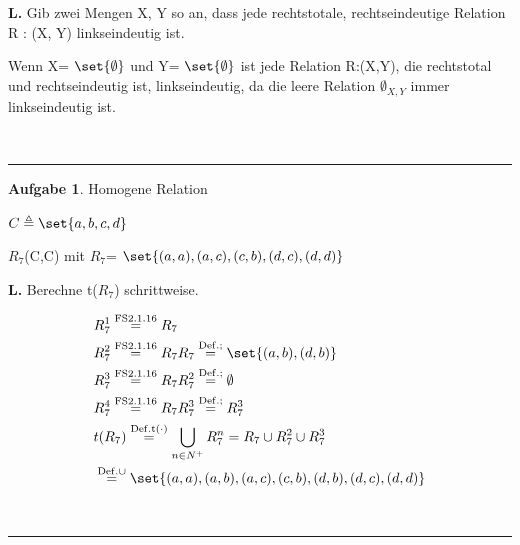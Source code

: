 \documentclass[10pt,leqno ]{article}
\DeclarePairedDelimiter\set\{\}
\newcommand\customeq[1]{\overset{\mathrm{#1}}{=}}
\theoremstyle{definition}
\newtheorem{problem}[theorem]{Aufgabe}
\newenvironment{solution}[1][L]{\begin{doublespace}\textbf{#1.}\quad }{\ \rule{0.5em}{0.5em}\end{doublespace}}
\begin{document}
\begin{solution}  
Gib zwei Mengen X, Y so an, dass jede rechtstotale, rechtseindeutige Relation R : (X, Y)
linkseindeutig ist.
   
   Wenn 
   X= \(\set {\emptyset} \)
   und Y= \(\set {\emptyset}\)
   ist jede Relation R:(X,Y), die rechtstotal und rechtseindeutig ist, linkseindeutig, da die leere Relation \(\emptyset_{X,Y}\) immer linkseindeutig ist.

   
\end{solution}

\begin{problem}
Homogene Relation
\end{problem}

   \( C \triangleq \set{ a,b,c,d} \)

   $R_7$(C,C) mit $R_7$= \( \set{ (a,a),(a,c),(c,b),(d,c),(d,d)} \)

\begin{solution}
Berechne t(\(R_7\)) schrittweise.

\begin{equation*}
   \begin{aligned}
    & R_{7}^1 \customeq{FS 2.1.16} R_7 \\
    & R_{7}^2 \customeq{FS 2.1.16} R_{7}R_{7} \customeq{Def. ;} \set{(a,b),(d,b)}\\
    & R_{7}^3 \customeq{FS 2.1.16} R_{7}R_7^2 \customeq{Def. ;} \emptyset\\
    & R_{7}^4 \customeq{FS 2.1.16} R_{7}R_7^3 \customeq{Def. ;} R_7^3 \\
    & t(R_7) \customeq{Def. t(\cdot)} \bigcup\limits_{n \in N^+} R_7^n = R_7 \cup R_7^2 \cup R_7^3\\
    & \customeq{Def. \cup} \set{(a,a),(a,b),(a,c),(c,b),(d,b),(d,c),(d,d)}
   \end{aligned}
\end{equation*}

\end{solution}
\end{document}
